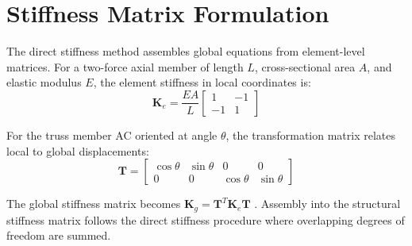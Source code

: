 \documentclass[11pt,a4paper]{article}
\begin{document}
\section{Stiffness Matrix Formulation}

The direct stiffness method assembles global equations from element-level matrices. For a two-force axial member of length $L$, cross-sectional area $A$, and elastic modulus $E$, the element stiffness in local coordinates is:
\begin{equation}
\mathbf{K}_e = \frac{EA}{L} \begin{bmatrix} 1 & -1 \\ -1 & 1 \end{bmatrix}
\end{equation}

For the truss member AC oriented at angle $\theta$, the transformation matrix relates local to global displacements:
\begin{equation}
\mathbf{T} = \begin{bmatrix} \cos\theta & \sin\theta & 0 & 0 \\ 0 & 0 & \cos\theta & \sin\theta \end{bmatrix}
\end{equation}

The global stiffness matrix becomes $\mathbf{K}_g = \mathbf{T}^T \mathbf{K}_e \mathbf{T}$ \cite{mcguire2000matrix}. Assembly into the structural stiffness matrix follows the direct stiffness procedure where overlapping degrees of freedom are summed.
\end{document}
